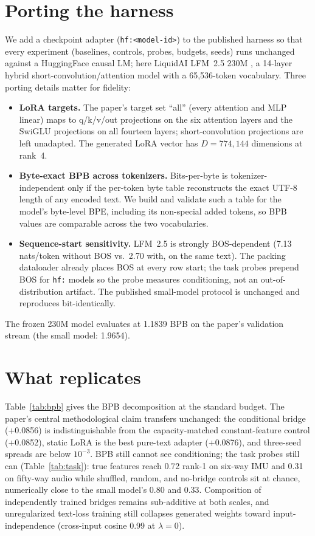 \documentclass[11pt]{article}
\begin{document}
\section{Porting the harness}
We add a checkpoint adapter (\texttt{hf:<model-id>}) to the published harness so that every experiment (baselines, controls, probes, budgets, seeds) runs unchanged against a HuggingFace causal LM; here LiquidAI LFM~2.5 230M \cite{liquidai2025lfm2}, a 14-layer hybrid short-convolution/attention model with a 65{,}536-token vocabulary. Three porting details matter for fidelity:
\begin{itemize}
  \item \textbf{LoRA targets.} The paper's target set ``all'' (every attention and MLP linear) maps to q/k/v/out projections on the six attention layers and the SwiGLU projections on all fourteen layers; short-convolution projections are left unadapted. The generated LoRA vector has $D = 774{,}144$ dimensions at rank~4.
  \item \textbf{Byte-exact BPB across tokenizers.} Bits-per-byte is tokenizer-independent only if the per-token byte table reconstructs the exact UTF-8 length of any encoded text. We build and validate such a table for the model's byte-level BPE, including its non-special added tokens, so BPB values are comparable across the two vocabularies.
  \item \textbf{Sequence-start sensitivity.} LFM~2.5 is strongly BOS-dependent (7.13 nats/token without BOS vs.\ 2.70 with, on the same text). The packing dataloader already places BOS at every row start; the task probes prepend BOS for \texttt{hf:} models so the probe measures conditioning, not an out-of-distribution artifact. The published small-model protocol is unchanged and reproduces bit-identically.
\end{itemize}
The frozen 230M model evaluates at 1.1839 BPB on the paper's validation stream (the small model: 1.9654).

\section{What replicates}
Table~\ref{tab:bpb} gives the BPB decomposition at the standard budget. The paper's central methodological claim transfers unchanged: the conditional bridge (+0.0856) is indistinguishable from the capacity-matched constant-feature control (+0.0852), static LoRA is the best pure-text adapter (+0.0876), and three-seed spreads are below $10^{-3}$. BPB still cannot see conditioning; the task probes still can (Table~\ref{tab:task}): true features reach 0.72 rank-1 on six-way IMU and 0.31 on fifty-way audio while shuffled, random, and no-bridge controls sit at chance, numerically close to the small model's 0.80 and 0.33. Composition of independently trained bridges remains sub-additive at both scales, and unregularized text-loss training still collapses generated weights toward input-independence (cross-input cosine 0.99 at $\lambda=0$).
\end{document}
